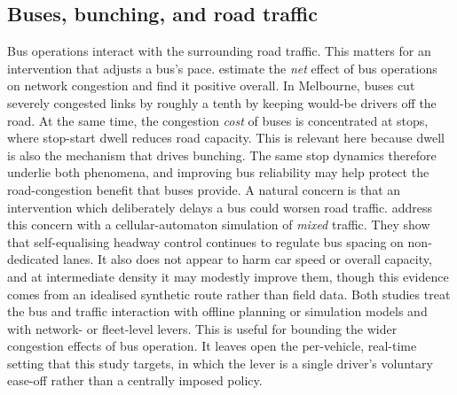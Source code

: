 \documentclass[final,5p,times,twocolumn,authoryear]{elsarticle}
\begin{document}
\subsection{Buses, bunching, and road traffic}
\label{sec:rw-traffic}
Bus operations interact with the surrounding road traffic. This matters for an intervention that
adjusts a bus's pace. \citet{NguyenPhuoc2018} estimate the \emph{net} effect of bus operations on
network congestion and find it positive overall. In Melbourne, buses cut severely congested links by
roughly a tenth by keeping would-be drivers off the road. At the same time, the congestion \emph{cost}
of buses is concentrated at stops, where stop-start dwell reduces road capacity. This is relevant here
because dwell is also the mechanism that drives bunching. The same stop dynamics therefore underlie
both phenomena, and improving bus reliability may help protect the road-congestion benefit that buses
provide. A natural concern is that an intervention which deliberately delays a bus could worsen road
traffic. \citet{Qiang2023} address this concern with a cellular-automaton simulation of \emph{mixed}
traffic. They show that self-equalising headway control continues to regulate bus spacing on
non-dedicated lanes. It also does not appear to harm car speed or overall capacity, and at
intermediate density it may modestly improve them, though this evidence comes from an idealised
synthetic route rather than field data. Both studies treat the bus and traffic interaction with
offline planning or simulation models and with network- or fleet-level levers. This is useful for
bounding the wider congestion effects of bus operation. It leaves open the per-vehicle, real-time
setting that this study targets, in which the lever is a single driver's voluntary ease-off rather
than a centrally imposed policy.
\end{document}
